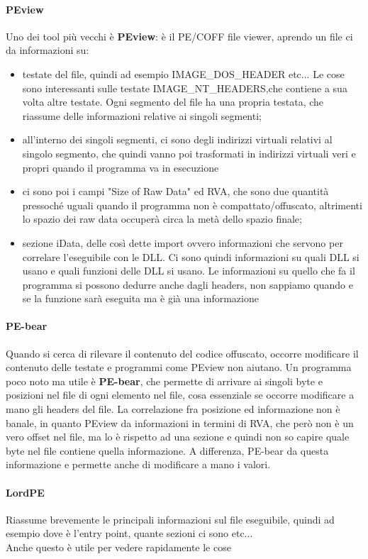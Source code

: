 \documentclass[12pt, oneside]{extbook}
\begin{document}
\paragraph{PEview} Uno dei tool più vecchi è \textbf{PEview}: è il PE/COFF file viewer, aprendo un file ci da informazioni su:
\begin{itemize}
\item testate del file, quindi ad esempio IMAGE\_DOS\_HEADER etc... Le cose sono interessanti sulle testate IMAGE\_NT\_HEADERS,che contiene a sua volta altre testate. Ogni segmento del file ha una propria testata, che riassume delle informazioni relative ai singoli segmenti;
\item all'interno dei singoli segmenti, ci sono degli indirizzi virtuali relativi al singolo segmento, che quindi vanno poi trasformati in indirizzi virtuali veri e propri quando il programma va in esecuzione
\item ci sono poi i campi "Size of Raw Data" ed RVA, che sono due quantità pressoché uguali quando il programma non è compattato/offuscato, altrimenti lo spazio dei raw data occuperà circa la metà dello spazio finale;
\item sezione iData, delle così dette import ovvero informazioni che servono per correlare l'eseguibile con le DLL. Ci sono quindi informazioni su quali DLL si usano e quali funzioni delle DLL si usano. Le informazioni su quello che fa il programma si possono dedurre anche dagli headers, non sappiamo quando e se la funzione sarà eseguita ma è già una informazione
\end{itemize}
\paragraph{PE-bear} Quando si cerca di rilevare il contenuto del codice offuscato, occorre modificare il contenuto delle testate e programmi come PEview non aiutano. Un programma poco noto ma utile è \textbf{PE-bear}, che permette di arrivare ai singoli byte e posizioni nel file di ogni elemento nel file, cosa essenziale se occorre modificare a mano gli headers del file. La correlazione fra posizione ed informazione non è banale, in quanto PEview da informazioni in termini di RVA, che però non è un vero offset nel file, ma lo è rispetto ad una sezione e quindi non so capire quale byte nel file contiene quella informazione. A differenza, PE-bear da questa informazione e permette anche di modificare a mano i valori.
\\
\paragraph{LordPE}
Riassume brevemente le principali informazioni sul file eseguibile, quindi ad esempio dove è l'entry point, quante sezioni ci sono etc... \\ Anche questo è utile per vedere rapidamente le cose
\\
\end{document}
